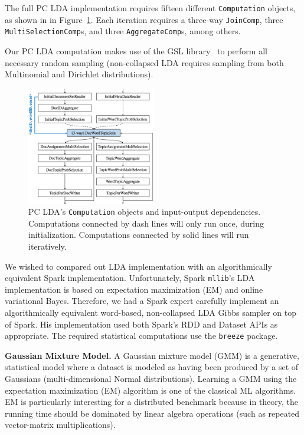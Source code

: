 The full PC LDA implementation requires fifteen different \texttt{Computation} objects, as shown in 
in Figure~\ref{fig:lda-query-graph}.  Each iteration requires a 
three-way \texttt{JoinComp}, three \texttt{MultiSelectionComp}s, and three
\texttt{AggregateComp}s, among others. 

Our PC LDA computation makes use of the GSL library~\cite{gsl} to perform all necessary random sampling (non-collapsed LDA requires 
sampling from both Multinomial and Dirichlet distributions).

\begin{figure}
\centering
\includegraphics[width=0.5\textwidth]{lda-query-graph.pdf}
  \caption{\label{fig:lda-query-graph} PC LDA's \texttt{Computation} objects and input-output dependencies. Computations
    connected by dash lines will only run once, during  
    initialization. Computations connected by solid lines will run iteratively.}
\end{figure}

We wished to compared out LDA implementation with an algorithmically equivalent Spark implementation.  Unfortunately,
Spark \texttt{mllib}'s LDA implementation is based on expectation
maximization (EM) and online variational Bayes.
Therefore, we had a Spark expert 
carefully implement an algorithmically
equivalent word-based, non-collapsed LDA Gibbs sampler on top of Spark.  His implementation used both
Spark's RDD and Dataset        
APIs as appropriate.
The required statistical computations use the
\texttt{breeze} package. 


\vspace{5pt}
\noindent
\textbf{Gaussian Mixture Model.} A Gaussian mixture model (GMM) is a generative, statistical model where a dataset is modeled
as having been produced by a set of Gaussians (multi-dimensional Normal distributions). Learning a GMM using
the expectation maximization (EM) algorithm is one of the classical ML algorithms.
EM is particularly interesting for a distributed benchmark because in theory, the running time should be dominated
by linear algebra operations (such as repeated vector-matrix multiplications).


